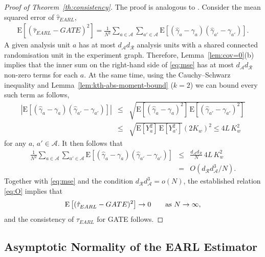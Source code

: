 \documentclass[sigconf,nonacm]{acmart}
\newcommand{\E}{\mathrm E}
\begin{document}
\begin{proof}[Proof of Theorem~\ref{th:consistency}]
    The proof is analogous to \cite[Theorem~4.2]{harshaw2023erl}. Consider the mean squared error of $\hat\tau_{EARL}$,
    \begin{eqnarray}\label{eq:mse}
        \E\left[(\hat\tau^{\phantom{1}}_{EARL} - GATE)^2\right] = \frac 1 {N^2} \sum_{a\in\mathcal{A}}\sum_{a'\in\mathcal{A}}\E[(\hat\gamma_a-\gamma_a)(\hat\gamma_{a'}-\gamma_{a'})].
    \end{eqnarray}
    A given analysis unit $a$ has at most $d_{\mathcal A}d_{\mathcal R}$ analysis units with a shared connected randomisation unit in the experiment graph. Therefore, Lemma~\ref{lem:cov=0}(b) implies that the inner sum on the right-hand side of \eqref{eq:mse} has at most $d_{\mathcal A}d_{\mathcal R}$ non-zero terms for each $a$. At the same time, using the Cauchy--Schwarz inequality and Lemma~\ref{lem:kth-abs-moment-bound} ($k=2$) we can bound every such term as follows,
\begin{eqnarray*}
    \left|\E[(\hat\gamma_{a}-\gamma_{a})(\hat\gamma_{a'}-\gamma_{a'})]\right| &\le&
    \sqrt{\E[(\hat\gamma_{a}-\gamma_{a})^2]\,\E[(\hat\gamma_{a'}-\gamma_{a'})^2]} \nonumber\\
    &\le& \sqrt{\E[Y_a^2]\,\E[Y_{a'}^2]}\left(2K_w\right)^2
    \le 4L\,K_w^2
\end{eqnarray*}
for any $a,\,a'\in\mathcal{A}$.
It then follows that
\begin{eqnarray}\label{eq:O}
    \frac 1 {N^2} \sum_{a\in\mathcal{A}}\sum_{a'\in\mathcal{A}}\E[(\hat\gamma_a-\gamma_a)(\hat\gamma_{a'}-\gamma_{a'})] &\le& \frac{d_{\mathcal A}d_{\mathcal R}}{N}\, 4L\,K_w^2 \nonumber\\ &=& O(d_{\mathcal R}^{\phantom{1}}d_{\mathcal A}^3/N).
\end{eqnarray}
Together with \eqref{eq:mse} and the condition $d_{\mathcal R}^{\phantom{1}}d_{\mathcal A}^3=o(N)$, the established relation \eqref{eq:O} implies that
$$
\E\left[(\hat\tau^{\phantom{1}}_{EARL} - GATE)^2\right]\to 0\qquad \textup{as }N\to\infty,
$$
and the consistency of $\hat\tau^{\phantom{1}}_{EARL}$ for GATE follows.
\end{proof}

\subsection{Asymptotic Normality of the EARL Estimator}
\end{document}
